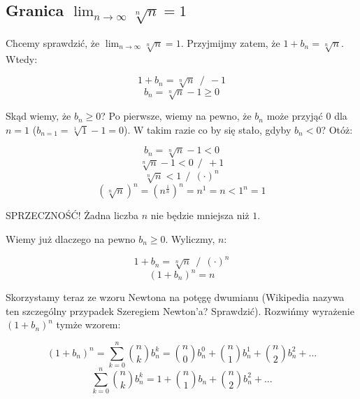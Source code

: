\documentclass[a4paper,oneside,openright,11pt]{article}
\numberwithin{equation}{section}
\begin{document}
\subsection{Granica $\lim_{n\to\infty} \sqrt[n]{n} = 1$}

Chcemy sprawdzić, że $\lim_{n\to\infty} \sqrt[n]{n} = 1$. Przyjmijmy zatem, że $1 + b_{n} = \sqrt[n]{n}$. Wtedy:

\begin{equation*}
    1 + b_{n} = \sqrt[n]{n} \ \ / \ \ -1
\end{equation*}
\begin{equation*}
    b_{n} = \sqrt[n]{n} - 1 \geq 0
\end{equation*}

\noindent
Skąd wiemy, że $b_{n} \geq 0$? Po pierwsze, wiemy na pewno, że $b_{n}$ może przyjąć $0$ dla $n = 1$ ($b_{n=1} = \sqrt[1]{1} - 1 = 0$). W takim razie co by się stało, gdyby $b_{n} < 0$? Otóż:

\begin{equation*}
    b_{n} = \sqrt[n]{n} - 1 < 0
\end{equation*}
\begin{equation*}
    \sqrt[n]{n} - 1 < 0 \ \ / \ \ +1
\end{equation*}
\begin{equation*}
    \sqrt[n]{n} < 1 \ \ / \ \ (\cdot)^n
\end{equation*}
\begin{equation*}
    (\sqrt[n]{n})^{n} = (n^{\frac{1}{n}})^n = n^1 = n < 1^n = 1
\end{equation*}

\begin{center}
    SPRZECZNOŚĆ! Żadna liczba $n$ nie będzie mniejsza niż $1$.
\end{center}

\noindent
Wiemy już dlaczego na pewno $b_{n} \geq 0$. Wyliczmy, $n$:

\begin{equation*}
    1 + b_{n} = \sqrt[n]{n} \ \ / \ \ (\cdot)^n
\end{equation*}
\begin{equation*}
    (1 + b_{n})^n = n 
\end{equation*}

\noindent
Skorzystamy teraz ze wzoru Newtona na potęgę dwumianu (Wikipedia nazywa ten szczególny przypadek Szeregiem Newton'a? Sprawdzić). Rozwińmy wyrażenie $(1 + b_{n})^n$ tymże wzorem:

\begin{equation*}
    (1 + b_{n})^n = \sum_{k=0}^{n} {n \choose k} b_{n}^{k} = {n \choose 0}b_{n}^{0} + {n \choose 1}b_{n}^{1} + {n \choose 2}b_{n}^{2} + \mbox{...}
\end{equation*}
\begin{equation*}
    \sum_{k=0}^{n} {n \choose k} b_{n}^{k} = 1 + {n \choose 1}b_{n} + {n \choose 2}b_{n}^{2} + \mbox{...}
\end{equation*}
\end{document}
